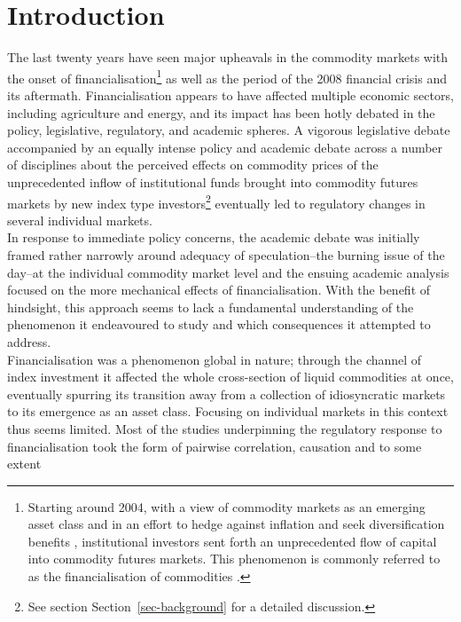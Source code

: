 \documentclass[
  authoryear,
  preprint,
  3p]{elsarticle}
\begin{document}
\setlength{\parindent}{0pt}

\section{Introduction}\label{sec-introduction}

The last twenty years have seen major upheavals in the commodity markets
with the onset of financialisation\footnote{Starting around 2004, with a
  view of commodity markets as an emerging asset class and in an effort
  to hedge against inflation and seek diversification benefits
  \citep{buyuksahin_speculators_2014, singleton_investor_2013},
  institutional investors sent forth an unprecedented flow of capital
  into commodity futures markets. This phenomenon is commonly referred
  to as the financialisation of commodities
  \citep{domanski_financial_2007}.} as well as the period of the 2008
financial crisis and its aftermath. Financialisation appears to have
affected multiple economic sectors, including agriculture and energy,
and its impact has been hotly debated in the policy, legislative,
regulatory, and academic spheres. A vigorous legislative debate
accompanied by an equally intense policy and academic debate across a
number of disciplines about the perceived effects on commodity prices of
the unprecedented inflow of institutional funds brought into commodity
futures markets by new index type investors\footnote{See section
  Section~\ref{sec-background} for a detailed discussion.} eventually
led to regulatory changes in several individual markets.\\
In response to immediate policy concerns, the academic debate was
initially framed rather narrowly around adequacy of speculation--the
burning issue of the day--at the individual commodity market level and
the ensuing academic analysis focused on the more mechanical effects of
financialisation. With the benefit of hindsight, this approach seems to
lack a fundamental understanding of the phenomenon it endeavoured to
study and which consequences it attempted to address.\\
Financialisation was a phenomenon global in nature; through the channel
of index investment it affected the whole cross-section of liquid
commodities at once, eventually spurring its transition away from a
collection of idiosyncratic markets to its emergence as an asset class.
Focusing on individual markets in this context thus seems limited. Most
of the studies underpinning the regulatory response to financialisation
took the form of pairwise correlation, causation and to some extent
\end{document}
